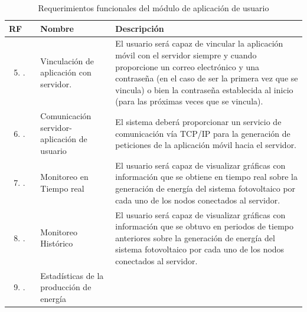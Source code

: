 \begin{longtable}{|M{1.6cm}|M{4.0cm}|M{6.0cm}|}
    \caption{Requerimientos funcionales del módulo de aplicación de usuario}
	\hline
	\textbf{RF} & \textbf{Nombre} & \textbf{Descripción} \\
	\hline
 	\begin{enumerate}[label=RF\arabic*]
 	    \setcounter{enumi}{4}
 	    \item.
 	\end{enumerate}
 	& Vinculación de aplicación con servidor.
 	& El usuario será capaz de vincular la aplicación móvil con el servidor siempre y cuando proporcione un correo electrónico y una contraseña (en el caso de ser la primera vez que se vincula) o bien la contraseña establecida al inicio (para las próximas veces que se vincula).\\
    \hline
    \begin{enumerate}[label=RF\arabic*]
        \setcounter{enumi}{5}
 	    \item.
 	\end{enumerate}
 	& Comunicación servidor-aplicación de usuario 
 	& El sistema deberá proporcionar un servicio de comunicación vía TCP/IP para la generación de peticiones de la aplicación móvil hacia el servidor. \\
    \hline
    \begin{enumerate}[label=RF\arabic*]
        \setcounter{enumi}{6}
 	    \item.
 	\end{enumerate}
 	& Monitoreo en Tiempo real 
 	& El usuario será capaz de visualizar gráficas con información que se obtiene en tiempo real sobre la generación de energía del sistema fotovoltaico por cada uno de los nodos conectados al servidor. \\
    \hline
    \begin{enumerate}[label=RF\arabic*]
        \setcounter{enumi}{7}
 	    \item.
 	\end{enumerate}
 	& Monitoreo Histórico 
 	& El usuario será capaz de visualizar gráficas con información que se obtuvo en periodos de tiempo anteriores sobre la generación de energía del sistema fotovoltaico por cada uno de los nodos conectados al servidor. \\
    \hline
    \begin{enumerate}[label=RF\arabic*]
        \setcounter{enumi}{8}
 	    \item.
 	\end{enumerate}
 	& Estadísticas de la producción de energía 

\end{longtable}
